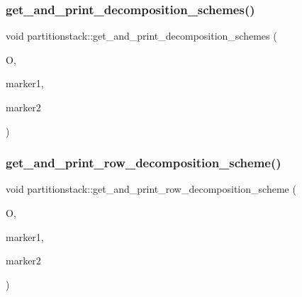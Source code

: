 \mbox{\label{classpartitionstack_ac4881b617c6c6e66c9f97ecf0b933c69}} 
\subsubsection{\texorpdfstring{get\+\_\+and\+\_\+print\+\_\+decomposition\+\_\+schemes()}{get\_and\_print\_decomposition\_schemes()}}
{\footnotesize\ttfamily void partitionstack\+::get\+\_\+and\+\_\+print\+\_\+decomposition\+\_\+schemes (\begin{DoxyParamCaption}\item[{\mbox{\hyperlink{classorthogonal}{orthogonal}} \&}]{O,  }\item[{\mbox{\hyperlink{galois_8h_a09fddde158a3a20bd2dcadb609de11dc}{I\+NT}}}]{marker1,  }\item[{\mbox{\hyperlink{galois_8h_a09fddde158a3a20bd2dcadb609de11dc}{I\+NT}}}]{marker2 }\end{DoxyParamCaption})}

\mbox{\label{classpartitionstack_a35a6b8e1f8c035a619673e618343d334}} 
\subsubsection{\texorpdfstring{get\+\_\+and\+\_\+print\+\_\+row\+\_\+decomposition\+\_\+scheme()}{get\_and\_print\_row\_decomposition\_scheme()}}
{\footnotesize\ttfamily void partitionstack\+::get\+\_\+and\+\_\+print\+\_\+row\+\_\+decomposition\+\_\+scheme (\begin{DoxyParamCaption}\item[{\mbox{\hyperlink{classorthogonal}{orthogonal}} \&}]{O,  }\item[{\mbox{\hyperlink{galois_8h_a09fddde158a3a20bd2dcadb609de11dc}{I\+NT}}}]{marker1,  }\item[{\mbox{\hyperlink{galois_8h_a09fddde158a3a20bd2dcadb609de11dc}{I\+NT}}}]{marker2 }\end{DoxyParamCaption})}


